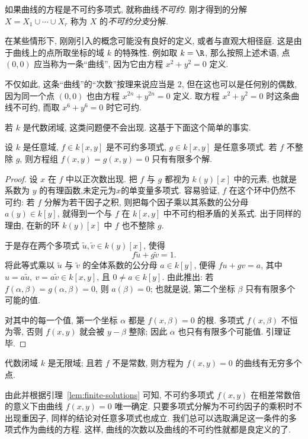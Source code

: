 \begin{definition}[不可约曲线]\label{def:irreducible-curve}
	如果曲线的方程是不可约多项式, 就称曲线\emph{不可约}. 刚才得到的分解 $X = X_1 \cup \cdots \cup X_r$ 称为 $X$ 的\emph{不可约分支}分解.
\end{definition}

在某些情形下, 刚刚引入的概念可能没有良好的定义, 或者与直观大相径庭. 这是由于曲线上的点所取坐标的域 $k$ 的特殊性. 例如取 $k = \R$, 那么按照上述术语, 点 $(0,0)$ 应当称为一条``曲线'', 因为它由方程 $x^2 + y^2 = 0$ 定义.

不仅如此, 这条``曲线''的``次数''按理来说应当是 $2$, 但在这也可以是任何别的偶数, 因为同一个点 $(0,0)$ 也由方程 $x^{2n} + y^{2n} = 0$ 定义. 取方程 $x^2 + y^2 = 0$ 时这条曲线不可约, 而取 $x^6 + y^6 = 0$ 时它可约.

若 $k$ 是代数闭域, 这类问题便不会出现. 这基于下面这个简单的事实.

\begin{lemma}\label{lem:finite-solutions}
	设 $k$ 是任意域, $f \in k[x,y]$ 是不可约多项式, $g \in k[x,y]$ 是任意多项式. 若 $f$ 不整除 $g$, 则方程组 $f(x,y) = g(x,y) = 0$ 只有有限多个解.
\end{lemma}

\begin{proof}
	设 $x$ 在 $f$ 中以正次数出现. 把 $f$ 与 $g$ 都视为 $k(y)[x]$ 中的元素, 也就是系数为 $y$ 的有理函数,未定元为$x$的单变量多项式. 容易验证, $f$ 在这个环中仍然不可约: 若 $f$ 分解为若干因子之积, 则把每个因子乘以其系数的公分母 $a(y) \in k[y]$, 就得到一个与 $f$ 在 $k[x,y]$ 中不可约相矛盾的关系式. 出于同样的理由, 在新的环 $k(y)[x]$ 中 $f$ 也不整除 $g$.

	于是存在两个多项式 $\tilde{u}, \tilde{v} \in k(y)[x]$, 使得
	\[
		f\tilde{u} + g\tilde{v} = 1.
	\]
	将此等式乘以 $\tilde{u}$ 与 $\tilde{v}$ 的全体系数的公分母 $a \in k[y]$, 便得 $fu + gv = a$, 其中 $u = a\tilde{u},\ v = a\tilde{v} \in k[x,y]$, 且 $0 \ne a \in k[y]$. 由此推出: 若 $f(\alpha, \beta) = g(\alpha, \beta) = 0$, 则 $a(\beta) = 0$; 也就是说, 第二个坐标 $\beta$ 只有有限多个可能的值.

	对其中的每一个值, 第一个坐标 $\alpha$ 都是 $f(x, \beta) = 0$ 的根. 多项式 $f(x, \beta)$ 不恒为零, 否则 $f(x,y)$ 就会被 $y - \beta$ 整除; 因此 $\alpha$ 也只有有限多个可能值. 引理证毕.
\end{proof}

\begin{remark}\label{rem:well-defined}
	代数闭域 $k$ 是无限域; 且若 $f$ 不是常数, 则方程为 $f(x,y) = 0$ 的曲线有无穷多个点.

	由此并根据引理~\ref{lem:finite-solutions} 可知, 不可约多项式 $f(x,y)$ 在相差常数倍的意义下由曲线 $f(x,y) = 0$ 唯一确定. 只要多项式分解为不可约因子的乘积时不出现重因子, 同样的结论对任意多项式也成立. 我们总可以选取满足这一条件的多项式作为曲线的方程. 这样, 曲线的次数以及曲线的不可约性就都是良定义的了.
\end{remark}


